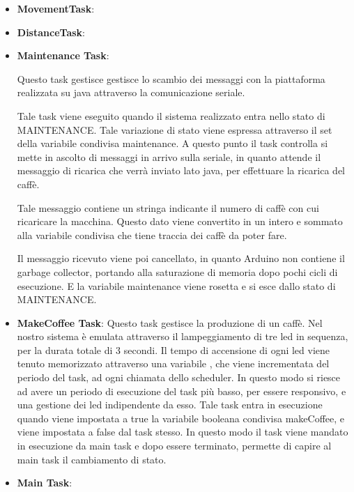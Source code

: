 \documentclass[a4paper]{article}
\begin{document}
\begin{itemize}
\item \textbf{MovementTask}:


\item \textbf{DistanceTask}:



\item \textbf{Maintenance Task}:

Questo task gestisce gestisce lo scambio dei messaggi con la piattaforma realizzata su java attraverso la comunicazione seriale.

Tale task viene eseguito quando il sistema realizzato entra nello stato di MAINTENANCE. Tale variazione di stato viene espressa attraverso il set della variabile condivisa maintenance.
A questo punto il task controlla si mette in ascolto di messaggi in arrivo sulla seriale, in quanto attende il messaggio di ricarica che verrà inviato lato java, per effettuare la ricarica del caffè.

Tale messaggio contiene un stringa indicante il numero di caffè con cui ricaricare la macchina. Questo dato viene convertito in un intero e sommato alla variabile condivisa che tiene traccia dei caffè da poter fare.

Il messaggio ricevuto viene poi cancellato, in quanto Arduino non contiene il garbage collector, portando alla saturazione di memoria dopo pochi cicli di esecuzione.
E la variabile maintenance viene rosetta e si esce dallo stato di MAINTENANCE.



\item \textbf{MakeCoffee Task}:
Questo task gestisce la produzione di un caffè. Nel nostro sistema è emulata attraverso il lampeggiamento di tre led in sequenza, per la durata totale di 3 secondi.
Il tempo di accensione di ogni led viene tenuto memorizzato attraverso una variabile , che viene incrementata del periodo del task, ad ogni chiamata dello scheduler. 
In questo modo si riesce ad avere un periodo di esecuzione del task più basso, per essere responsivo, e una gestione dei led indipendente da esso.
Tale task entra in esecuzione quando viene impostata a true la variabile booleana condivisa makeCoffee, e viene impostata a false dal task stesso. In questo modo il task viene mandato in esecuzione da main task e dopo essere terminato, permette di capire al main task il cambiamento di stato. 



\item \textbf{Main Task}:







\end{itemize}
\end{document}
